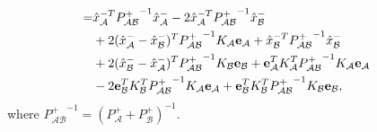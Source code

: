 \documentclass[10pt]{article}
\theoremstyle{plain}\theorembodyfont{\normalfont}
\begin{document}
\begin{align}
\begin{split}
\\
=&\hat x_\mathcal{A}^{-T}{P^+_{\mathcal{A}\mathcal{B}}}^{-1}\hat x_\mathcal{A}^-
-2\hat x_\mathcal{A}^{-T}{P^+_{\mathcal{A}\mathcal{B}}}^{-1}\hat x_\mathcal{B}^-
\\
&+2(\hat x_\mathcal{A}^{-}-\hat x_\mathcal{B}^{-})^T{P^+_{\mathcal{A}\mathcal{B}}}^{-1}K_\mathcal{A}{\bf e}_\mathcal{A}
+\hat x_\mathcal{B}^{-T}{P^+_{\mathcal{A}\mathcal{B}}}^{-1}\hat x_\mathcal{B}^-
\\
&+2(\hat x_\mathcal{B}^{-}-\hat x_\mathcal{A}^{-})^T{P^+_{\mathcal{A}\mathcal{B}}}^{-1}K_\mathcal{B}{\bf e}_\mathcal{B}
+{\bf e}_\mathcal{A}^TK_\mathcal{A}^T{P^+_{\mathcal{A}\mathcal{B}}}^{-1}K_\mathcal{A}{\bf e}_\mathcal{A}
\\
&-2{\bf e}_\mathcal{B}^TK_\mathcal{B}^T{P^+_{\mathcal{A}\mathcal{B}}}^{-1}K_\mathcal{A}{\bf e}_\mathcal{A}
+{\bf e}_\mathcal{B}^TK_\mathcal{B}^T{P^+_{\mathcal{A}\mathcal{B}}}^{-1}K_\mathcal{B}{\bf e}_\mathcal{B},
\label{eqn:uexpanded}
\end{split}
\end{align}
where ${P^+_{\mathcal{A}\mathcal{B}}}^{-1}=(P_\mathcal{A}^++P_\mathcal{B}^+)^{-1}$. 


\newcommand{\Iij}{\ensuremath{\mathbf{1}_{ij}}}
\end{document}

